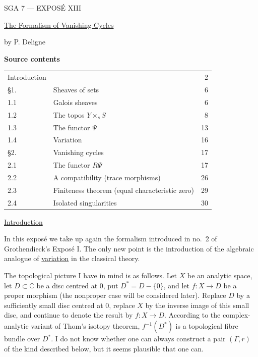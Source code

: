 \clearpage
\begin{center}
{\large SGA 7 --- EXPOS\'E XIII}\par
\vspace{2em}
{\Large\underline{The Formalism of Vanishing Cycles}}\par
\vspace{1.5em}
{\large by P. Deligne}
\end{center}

\medskip
\noindent\textbf{Source contents}
\begin{center}
\begin{tabular}{@{}llr@{}}
Introduction && 2\\
\S1. & Sheaves of sets & 6\\
1.1 & Galois sheaves & 6\\
1.2 & The topos $Y\times_s S$ & 8\\
1.3 & The functor $\Psi$ & 13\\
1.4 & Variation & 16\\
\S2. & Vanishing cycles & 17\\
2.1 & The functor $R\Psi$ & 17\\
2.2 & A compatibility (trace morphisms) & 26\\
2.3 & Finiteness theorem (equal characteristic zero) & 29\\
2.4 & Isolated singularities & 30
\end{tabular}
\end{center}


\medskip
\underline{Introduction}

In this expos\'e we take up again the formalism introduced in no.~2 of
Grothendieck's Expos\'e I.  The only new point is the introduction of the
algebraic analogue of \underline{variation} in the classical theory.

The topological picture I have in mind is as follows.  Let $X$ be an
analytic space, let $D\subset\mathbb C$ be a disc centred at $0$, put
$D^*=D-\{0\}$, and let $f:X\longrightarrow D$ be a proper morphism (the
nonproper case will be considered later).  Replace $D$ by a sufficiently
small disc centred at $0$, replace $X$ by the inverse image of this small
disc, and continue to denote the result by $f:X\longrightarrow D$.
According to the complex-analytic variant of Thom's isotopy theorem,
$f^{-1}(D^*)$ is a topological fibre bundle over $D^*$.  I do not know
whether one can always construct a pair $(\Gamma,r)$ of the kind
described below, but it seems plausible that one can.

